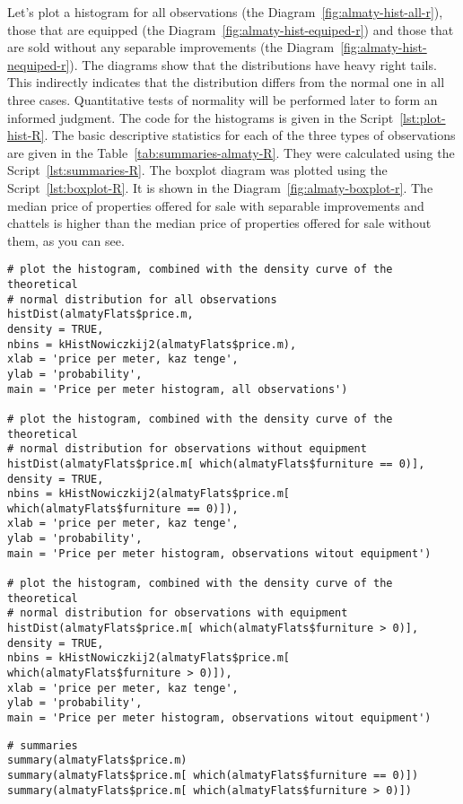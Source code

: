 \documentclass[]{scrreprt}
\begin{document}
Let's plot a histogram for all observations (the Diagram~\ref{fig:almaty-hist-all-r}), those that are equipped (the Diagram~\ref{fig:almaty-hist-equiped-r}) and those that are sold without any separable improvements (the Diagram~\ref{fig:almaty-hist-nequiped-r}). The diagrams show that the distributions have heavy right tails. This indirectly indicates that the distribution differs from the normal one in all three cases. Quantitative tests of normality will be performed later to form an informed judgment. The code for the histograms is given in the Script~\ref{lst:plot-hist-R}. The basic descriptive statistics for each of the three types of observations are given in the Table~\ref{tab:summaries-almaty-R}. They were calculated using the Script~\ref{lst:summaries-R}. The boxplot diagram was plotted using the Script~\ref{lst:boxplot-R}. It is shown in the Diagram~\ref{fig:almaty-boxplot-r}. The median price of properties offered for sale with separable improvements and chattels is higher than the median price of properties offered for sale without them, as you can see.
%
\begin{lstlisting}[float=htp, caption = Plotting histograms for observations of different types, firstnumber=1, label= lst:plot-hist-R]
# plot the histogram, combined with the density curve of the theoretical
# normal distribution for all observations
histDist(almatyFlats$price.m,
density = TRUE,
nbins = kHistNowiczkij2(almatyFlats$price.m),
xlab = 'price per meter, kaz tenge',
ylab = 'probability',
main = 'Price per meter histogram, all observations')

# plot the histogram, combined with the density curve of the theoretical
# normal distribution for observations without equipment
histDist(almatyFlats$price.m[ which(almatyFlats$furniture == 0)],
density = TRUE,
nbins = kHistNowiczkij2(almatyFlats$price.m[ which(almatyFlats$furniture == 0)]),
xlab = 'price per meter, kaz tenge',
ylab = 'probability',
main = 'Price per meter histogram, observations witout equipment')

# plot the histogram, combined with the density curve of the theoretical
# normal distribution for observations with equipment
histDist(almatyFlats$price.m[ which(almatyFlats$furniture > 0)],
density = TRUE,
nbins = kHistNowiczkij2(almatyFlats$price.m[ which(almatyFlats$furniture > 0)]),
xlab = 'price per meter, kaz tenge',
ylab = 'probability',
main = 'Price per meter histogram, observations witout equipment')
\end{lstlisting}
%
\begin{lstlisting}[float=htp, caption = Calculation of basic descriptive statistics for observations of different types, firstnumber=1, label= lst:summaries-R]
# summaries
summary(almatyFlats$price.m)
summary(almatyFlats$price.m[ which(almatyFlats$furniture == 0)])
summary(almatyFlats$price.m[ which(almatyFlats$furniture > 0)])
\end{lstlisting}
\end{document}
